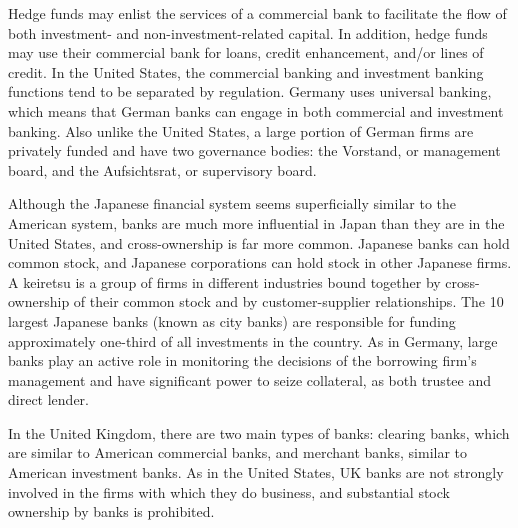 \documentclass[11pt]{article}
\begin{document}
Hedge funds may enlist the services of a commercial bank to facilitate the flow of both investment- and non-investment-related capital. In addition, hedge funds may use their commercial bank for loans, credit enhancement, and/or lines of credit. In the United States, the commercial banking and investment banking functions tend to be separated by regulation. Germany uses universal banking, which means that German banks can engage in both commercial and investment banking. Also unlike the United States, a large portion of German firms are privately funded and have two governance bodies: the Vorstand, or management board, and the Aufsichtsrat, or supervisory board.

Although the Japanese financial system seems superficially similar to the American system, banks are much more influential in Japan than they are in the United States, and cross-ownership is far more common. Japanese banks can hold common stock, and Japanese corporations can hold stock in other Japanese firms. A keiretsu is a group of firms in different industries bound together by cross-ownership of their common stock and by customer-supplier relationships. The 10 largest Japanese banks (known as city banks) are responsible for funding approximately one-third of all investments in the country. As in Germany, large banks play an active role in monitoring the decisions of the borrowing firm's management and have significant power to seize collateral, as both trustee and direct lender.

In the United Kingdom, there are two main types of banks: clearing banks, which are similar to American commercial banks, and merchant banks, similar to American investment banks. As in the United States, UK banks are not strongly involved in the firms with which they do business, and substantial stock ownership by banks is prohibited.
\end{document}
